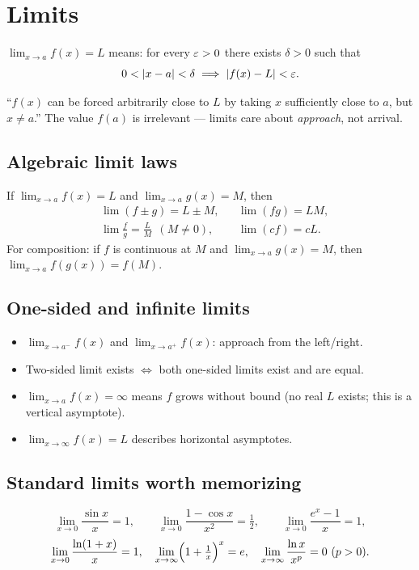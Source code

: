 \section{Limits}

\begin{definition}
$\displaystyle \lim_{x \to a} f(x) = L$ means: for every $\varepsilon > 0$ there exists $\delta > 0$
such that
\[ 0 < |x - a| < \delta \;\Longrightarrow\; |f(x) - L| < \varepsilon. \]
\end{definition}

\begin{intuition}
``$f(x)$ can be forced arbitrarily close to $L$ by taking $x$ sufficiently close to $a$, but
$x \ne a$.'' The value $f(a)$ is irrelevant --- limits care about \emph{approach}, not arrival.
\end{intuition}

\subsection{Algebraic limit laws}
If $\lim_{x\to a} f(x) = L$ and $\lim_{x\to a} g(x) = M$, then
\[
\begin{aligned}
&\lim (f \pm g) = L \pm M, &&\lim (fg) = LM, \\
&\lim \tfrac{f}{g} = \tfrac{L}{M}\ \ (M\neq 0), &&\lim (cf) = cL.
\end{aligned}
\]
For composition: if $f$ is continuous at $M$ and $\lim_{x\to a} g(x) = M$, then
$\lim_{x\to a} f(g(x)) = f(M)$.

\subsection{One-sided and infinite limits}
\begin{itemize}[leftmargin=*,nosep]
  \item $\lim_{x\to a^-} f(x)$ and $\lim_{x\to a^+} f(x)$: approach from the left/right.
  \item Two-sided limit exists $\iff$ both one-sided limits exist and are equal.
  \item $\lim_{x\to a} f(x) = \infty$ means $f$ grows without bound (no real $L$ exists; this is a vertical asymptote).
  \item $\lim_{x\to \infty} f(x) = L$ describes horizontal asymptotes.
\end{itemize}

\subsection{Standard limits worth memorizing}
\begin{keybox}
\[
\lim_{x \to 0} \frac{\sin x}{x} = 1, \qquad
\lim_{x \to 0} \frac{1 - \cos x}{x^2} = \tfrac{1}{2}, \qquad
\lim_{x \to 0} \frac{e^x - 1}{x} = 1,
\]
\[
\lim_{x \to 0} \frac{\ln(1+x)}{x} = 1, \quad
\lim_{x \to \infty} \Bigl(1 + \tfrac{1}{x}\Bigr)^x = e, \quad
\lim_{x \to \infty} \frac{\ln x}{x^p} = 0 \ (p>0).
\]
\end{keybox}

